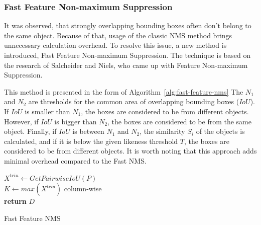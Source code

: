 \subsubsection{Fast Feature Non-maximum Suppression} \label{subsubsec:fast-feature-nms}

It was observed, that strongly overlapping bounding boxes often don't belong to the same object.
Because of that, usage of the classic NMS method brings unnecessary calculation overhead.
To resolve this issue, a new method is introduced, Fast Feature Non-maximum Suppression.
The technique is based on the research of Salcheider and Niels,
who came up with Feature Non-maximum Suppression. \cite{inproceedingsFeatureNMS}

\par

This method is presented in the form of Algorithm~\ref{alg:fast-feature-nms}
The $N_1$ and $N_2$ are thresholds for the common area of overlapping bounding boxes ($IoU$).
If $IoU$ is smaller than $N_1$, the boxes are considered to be from different objects.
However, if $IoU$ is bigger than $N_2$, the boxes are considered to be from the same object.
Finally, if $IoU$ is between $N_1$ and $N_2$, the similarity $S_i$ of the objects is calculated,
and if it is below the given likeness threshold $T$, the boxes are considered to be from different objects.
It is worth noting that this approach adds minimal overhead compared to the Fast NMS.

\begin{minipage}{\linewidth}
\begin{algorithm}[H] \label{alg:fast-feature-nms}
    \SetAlgoLined
    $X^{triu} \leftarrow GetPairwiseIoU(P)$ \\
    $K \leftarrow max(X^{triu})$ column-wise \\
    \textbf{return} $D$
    \caption{Fast Feature NMS \cite{inproceedingsPlaneSegNet}}
\end{algorithm}
\end{minipage}

